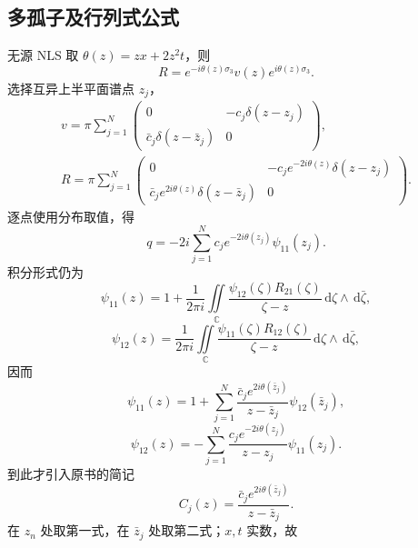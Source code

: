 \documentclass[lang=cn,scheme=chinese,mode=simple,device=normal,color=blue,math=cm,thmcnt=section,12pt]{elegantbook}
\newcommand{\dd}{\,\mathrm{d}}
\newcommand{\eqq}[2]{\tag{#1}\label{eq:#1}#2}
\begin{document}
\subsection{多孤子及行列式公式}
无源 NLS 取 $\theta(z)=zx+2z^2t$，则
\begin{equation}
\eqq{7.2.61}{R=e^{-i\theta(z)\sigma_3}v(z)e^{i\theta(z)\sigma_3}.}
\end{equation}
选择互异上半平面谱点 $z_j$，
\begin{equation}
\eqq{7.2.62}{\begin{gathered}
v=\pi\sum\limits_{j=1}^N\begin{pmatrix}0&-c_j\delta(z-z_j)\\\bar c_j\delta(z-\bar z_j)&0\end{pmatrix},\\
R=\pi\sum\limits_{j=1}^N\begin{pmatrix}0&-c_je^{-2i\theta(z)}\delta(z-z_j)\\
\bar c_je^{2i\theta(z)}\delta(z-\bar z_j)&0\end{pmatrix}.
\end{gathered}}
\end{equation}
逐点使用分布取值，得
\begin{equation}
\eqq{7.2.63}{q=-2i\sum\limits_{j=1}^Nc_je^{-2i\theta(z_j)}\psi_{11}(z_j).}
\end{equation}
积分形式仍为
\begin{equation}
\eqq{7.2.64}{\psi_{11}(z)=1+\dfrac{1}{2\pi i}\iint\limits_{\mathbb C}\dfrac{\psi_{12}(\zeta)R_{21}(\zeta)}{\zeta-z}\dd\zeta\wedge\dd\bar\zeta,}
\end{equation}
\begin{equation}
\eqq{7.2.65}{\psi_{12}(z)=\dfrac{1}{2\pi i}\iint\limits_{\mathbb C}\dfrac{\psi_{11}(\zeta)R_{12}(\zeta)}{\zeta-z}\dd\zeta\wedge\dd\bar\zeta,}
\end{equation}
因而
\begin{equation}
\eqq{7.2.66}{\psi_{11}(z)=1+\sum\limits_{j=1}^N\dfrac{\bar c_je^{2i\theta(\bar z_j)}}{z-\bar z_j}\psi_{12}(\bar z_j),}
\end{equation}
\begin{equation}
\eqq{7.2.67}{\psi_{12}(z)=-\sum\limits_{j=1}^N\dfrac{c_je^{-2i\theta(z_j)}}{z-z_j}\psi_{11}(z_j).}
\end{equation}
到此才引入原书的简记
\begin{equation}
\eqq{7.2.68}{C_j(z)=\dfrac{\bar c_je^{2i\theta(\bar z_j)}}{z-\bar z_j}.}
\end{equation}
在 $z_n$ 处取第一式，在 $\bar z_j$ 处取第二式；$x,t$ 实数，故
\end{document}
